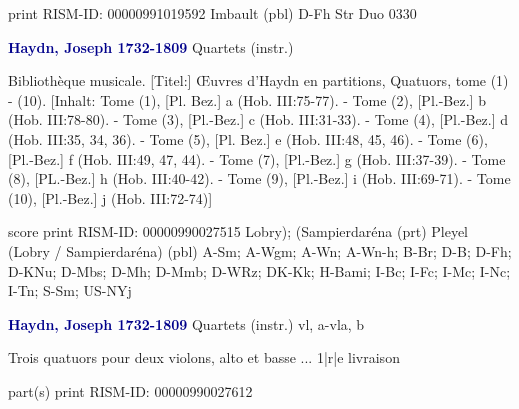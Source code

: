 \documentclass[twocolumn]{book}
\begin{document}
\newline print
\newline RISM-ID: 00000991019592
\newline Imbault  (pbl)
\newline D-Fh  Str Duo 0330
\newline \par \vspace{7pt} \textcolor{darkblue}{\textbf{Haydn, Joseph  1732-1809}}
\newline Quartets (instr.)    
\newline \begin{itshape}[Umschlagtitel:] Bibliothèque musicale. [Titel:] Œuvres d'Haydn en partitions, Quatuors, tome (1) - (10). [Inhalt: Tome (1), [Pl. Bez.] a (Hob. III:75-77). - Tome (2), [Pl.-Bez.] b (Hob. III:78-80). - Tome (3), [Pl.-Bez.] c (Hob. III:31-33). - Tome (4), [Pl.-Bez.] d (Hob. III:35, 34, 36). - Tome (5), [Pl. Bez.] e (Hob. III:48, 45, 46). - Tome (6), [Pl.-Bez.] f (Hob. III:49, 47, 44). - Tome (7), [Pl.-Bez.] g (Hob. III:37-39). - Tome (8), [PL.-Bez.] h (Hob. III:40-42). - Tome (9), [Pl.-Bez.] i (Hob. III:69-71). - Tome (10), [Pl.-Bez.] j (Hob. III:72-74)]\end{itshape} 
\newline \textcolor{darkblue}{}  score  
\newline print
\newline RISM-ID: 00000990027515
\newline Lobry); (Sampierdaréna  (prt)
\newline Pleyel (Lobry / Sampierdaréna)  (pbl)
\newline A-Sm; A-Wgm; A-Wn; A-Wn-h; B-Br; D-B; D-Fh; D-KNu; D-Mbs; D-Mh; D-Mmb; D-WRz; DK-Kk; H-Bami; I-Bc; I-Fc; I-Mc; I-Nc; I-Tn; S-Sm; US-NYj
\newline \par \vspace{7pt} \textcolor{darkblue}{\textbf{Haydn, Joseph  1732-1809}}
\newline Quartets (instr.)    
 vl, a-vla, b
\newline \begin{itshape}Trois quatuors pour deux violons, alto et basse ... 1|r|e livraison\end{itshape} 
\newline \textcolor{darkblue}{}  part(s)  
\newline print
\newline RISM-ID: 00000990027612
\end{document}
